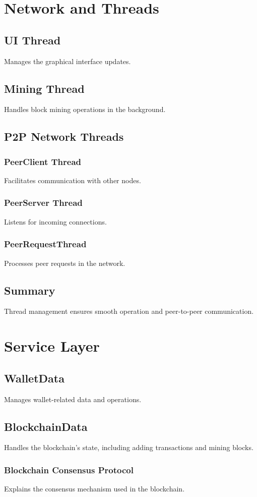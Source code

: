 \documentclass[12pt,a4paper]{report}
\begin{document}
\chapter{Network and Threads}
\section{UI Thread}
Manages the graphical interface updates.
\section{Mining Thread}
Handles block mining operations in the background.
\section{P2P Network Threads}
\subsection{PeerClient Thread}
Facilitates communication with other nodes.
\subsection{PeerServer Thread}
Listens for incoming connections.
\subsection{PeerRequestThread}
Processes peer requests in the network.
\section{Summary}
Thread management ensures smooth operation and peer-to-peer communication.

\chapter{Service Layer}
\section{WalletData}
Manages wallet-related data and operations.
\section{BlockchainData}
Handles the blockchain's state, including adding transactions and mining blocks.
\subsection{Blockchain Consensus Protocol}
Explains the consensus mechanism used in the blockchain.
\end{document}
